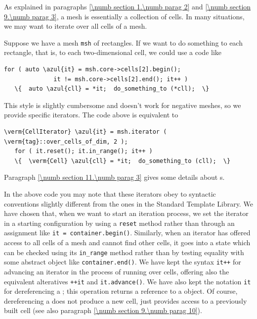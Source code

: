 As explained in paragraphs \ref{\numb section 1.\numb parag 2} and
\ref{\numb section 9.\numb parag 3}, a mesh is essentially a collection of cells.
In many situations, we may want to iterate over all cells of a mesh.

Suppose we have a mesh {\small\tt msh} of rectangles.
If we want to do something to each rectangle, that is, to each two-dimensional cell,
we could use a code like

\begin{Verbatim}[commandchars=\\\{\},formatcom=\small\tt,
   baselinestretch=0.94,framesep=2mm                      ]
   for ( auto \azul{it} = msh.core->cells[2].begin();
              it != msh.core->cells[2].end(); it++ )
   \{  auto \azul{cll} = *it;  do_something_to (*cll);  \}
\end{Verbatim}

This style is slightly cumbersome and doesn't work for negative meshes,
so we provide specific iterators.
The code above is equivalent to

\begin{Verbatim}[commandchars=\\\{\},formatcom=\small\tt,
   baselinestretch=0.94,framesep=2mm                      ]
   \verm{CellIterator} \azul{it} = msh.iterator ( \verm{tag}::over_cells_of_dim, 2 );
   for ( it.reset(); it.in_range(); it++ )
   \{  \verm{Cell} \azul{cll} = *it;  do_something_to (cll);  \}
\end{Verbatim}

Paragraph \ref{\numb section 11.\numb parag 3} gives some details about {\small\tt{}}s.

In the above code you may note that these iterators obey to syntactic conventions
slightly different from the ones in the Standard Template Library.
We have chosen that, when we want to start an iteration process, we set the iterator in
a starting configuration by using a {\small\tt reset} method rather than through an assignment
like {\small\tt it = container.begin()}.
Similarly, when an iterator has offered access to all cells of a mesh and cannot find
other cells, it goes into a state which can be checked using its {\small\tt in\_range} method
rather than by testing equality with some abstract object like {\small\tt container.end()}.
We have kept the syntax {\small\tt it++} for advancing an iterator in the process of
running over cells, offering also the equivalent alteratives {\small\tt ++it} and
{\small\tt it.advance()}.
We have also kept the notation {\small\tt *it} for dereferencing a {\small\tt {}};
this operation returns a reference to a {\small\tt {}} object.
Of course, dereferencing a {\small\tt {}} does not produce a new cell,
just provides access to a previously built cell
(see also paragraph \ref{\numb section 9.\numb parag 10}).
\vfil\eject

